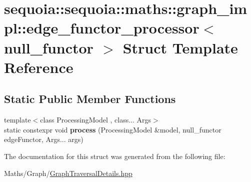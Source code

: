 \hypertarget{structsequoia_1_1sequoia_1_1maths_1_1graph__impl_1_1edge__functor__processor_3_01null__functor_01_4}{}\section{sequoia\+::sequoia\+::maths\+::graph\+\_\+impl\+::edge\+\_\+functor\+\_\+processor$<$ null\+\_\+functor $>$ Struct Template Reference}
\label{structsequoia_1_1sequoia_1_1maths_1_1graph__impl_1_1edge__functor__processor_3_01null__functor_01_4}
\subsection*{Static Public Member Functions}
\begin{DoxyCompactItemize}
\item 
\mbox{\label{structsequoia_1_1sequoia_1_1maths_1_1graph__impl_1_1edge__functor__processor_3_01null__functor_01_4_a906906b467f3af041f67cca3f6191b3a}} 
{\footnotesize template$<$class Processing\+Model , class... Args$>$ }\\static constexpr void {\bfseries process} (Processing\+Model \&model, null\+\_\+functor edge\+Functor, Args... args)
\end{DoxyCompactItemize}


The documentation for this struct was generated from the following file\+:\begin{DoxyCompactItemize}
\item 
Maths/\+Graph/\mbox{\hyperlink{_graph_traversal_details_8hpp}{Graph\+Traversal\+Details.\+hpp}}\end{DoxyCompactItemize}
